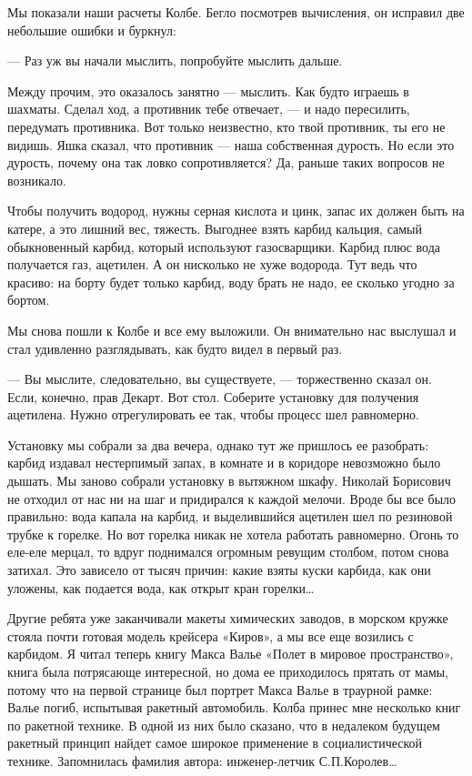 Мы показали наши  расчеты Колбе. Бегло  посмотрев вычисления, он  исправил
две небольшие ошибки и буркнул:

— Раз уж вы начали мыслить, попробуйте мыслить дальше.

Между прочим,  это  оказалось  занятно  — мыслить.  Как  будто  играешь  в
шахматы. Сделал  ход, а  противник  тебе отвечает,  — и  надо  пересилить,
передумать противника. Вот только неизвестно,  кто твой противник, ты  его
не видишь. Яшка сказал, что противник  — наша собственная дурость. Но  если
это дурость,  почему  она  так  ловко  сопротивляется?  Да,  раньше  таких
вопросов не возникало.

Чтобы получить водород, нужны серная кислота и цинк, запас их должен  быть
на катере, а это лишний вес, тяжесть. Выгоднее взять карбид кальция, самый
обыкновенный карбид,  который используют  газосварщики. Карбид  плюс  вода
получается газ, ацетилен. А  он нисколько не хуже  водорода. Тут ведь  что
красиво: на борту  будет только  карбид, воду  брать не  надо, ее  сколько
угодно за бортом.

Мы снова пошли к Колбе и все  ему выложили. Он внимательно нас выслушал  и
стал удивленно разглядывать, как будто видел в первый раз.

— Вы мыслите,  следовательно, вы  существуете, —  торжественно сказал  он.
Если, конечно,  прав Декарт.  Вот стол.  Соберите установку  для  получения
ацетилена. Нужно отрегулировать ее так, чтобы процесс шел равномерно.

Установку мы собрали за два вечера,  однако тут же пришлось ее  разобрать:
карбид издавал нестерпимый запах, в  комнате и в коридоре невозможно  было
дышать. Мы заново собрали установку в вытяжном шкафу. Николай Борисович не
отходил от нас ни на шаг и  придирался к каждой мелочи. Вроде бы все  было
правильно: вода капала на карбид, и выделившийся ацетилен шел по  резиновой
трубке к  горелке. Но  вот горелка  никак не  хотела работать  равномерно.
Огонь то еле-еле  мерцал, то  вдруг поднимался  огромным ревущим  столбом,
потом снова  затихал. Это  зависело  от тысяч  причин: какие  взяты  куски
карбида, как они уложены, как подается вода, как открыт кран горелки…

Другие ребята уже заканчивали макеты химических заводов, в морском  кружке
стояла почти готовая  модель крейсера  «Киров», а  мы все  еще возились  с
карбидом. Я читал теперь книгу Макса Валье «Полет в мировое пространство»,
книга была потрясающе интересной, но дома ее приходилось прятать от  мамы,
потому что на первой  странице был портрет Макса  Валье в траурной  рамке:
Валье погиб,  испытывая ракетный  автомобиль. Колба  принес мне  несколько
книг по ракетной  технике. В одной  из них было  сказано, что в  недалеком
будущем   ракетный   принцип   найдет    самое   широкое   применение    в
социалистической  технике.  Запомнилась  фамилия  автора:   инженер-летчик
С.П.Королев…

